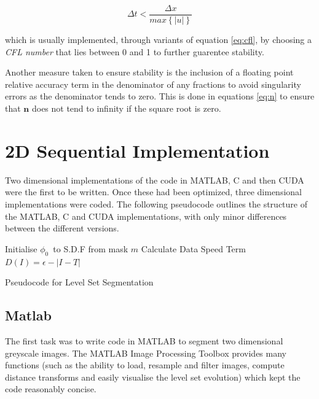 \begin{equation}
\Delta t < \frac{\Delta x}{max\left\{|u|\right\}}
\label{eq:cfl}
\end{equation}

which is usually implemented, through variants of equation \eqref{eq:cfl}, by choosing a \textit{CFL number} that lies between 0 and 1 to further guarentee stability.

Another measure taken to ensure stability is the inclusion of a floating point relative accuracy term in the denominator of any fractions to avoid singularity errors as the denominator tends to zero. This is done in equations \eqref{eq:n} to ensure that $\textbf{n}$ does not tend to infinity if the square root is zero.

\section{2D Sequential Implementation}
Two dimensional implementations of the code in MATLAB, C and then CUDA were the first to be written. Once these had been optimized, three dimensional implementations were coded. The following pseudocode outlines the structure of the MATLAB, C and CUDA implementations, with only minor differences between the different versions.

\begin{algorithm}[h]
\dontprintsemicolon
{}
\BlankLine
\SetLine
Initialise $\phi_0$\ to S.D.F from mask $m$\;
Calculate Data Speed Term $D(I)= \epsilon - |I-T|$\;
\caption{Pseudocode for Level Set Segmentation}\label{alg:alg}
\end{algorithm}


	\subsection{Matlab}
The first task was to write code in MATLAB to segment two dimensional greyscale images. The MATLAB Image Processing Toolbox provides many functions (such as the ability to load, resample and filter images, compute distance transforms and easily visualise the level set evolution) which kept the code reasonably concise. 

